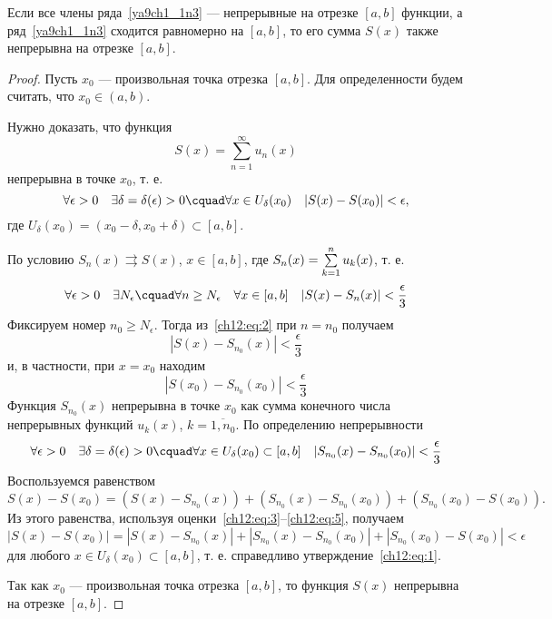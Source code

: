 \begin{thm}
	\label{ch12:th:continuity}
	Если все члены ряда~\eqref{ya9ch1_1n3} --- непрерывные на отрезке $[a, b]$ функции,
	а ряд~\eqref{ya9ch1_1n3} сходится равномерно на $[a, b]$, то его сумма $S(x)$
	также непрерывна на отрезке $[a, b]$.
\end{thm}
\begin{proof}
	Пусть $x_0$ --- произвольная точка отрезка $[a, b]$. Для определенности будем считать,
	что $x_0 \in (a, b)$.

	Нужно доказать, что функция
	$$
		S(x) = \sum_{n=1}^{\infty} u_n(x)
	$$
	непрерывна в точке $x_0$, т. е.
	\begin{equation}
		\label{ch12:eq:1}
		\forall \epsilon > 0 \quad \exists \delta = \delta(\epsilon) > 0 \cquad
			\forall x \in U_{\delta}(x_0) \quad |S(x) - S(x_0)| < \epsilon,
	\end{equation}
	где $U_{\delta}(x_0) = (x_0 - \delta, x_0 + \delta) \subset [a, b]$.

	По условию $S_n(x) \rightrightarrows S(x)$, $x \in [a, b]$,
	где $S_n(x) = \sum_{k=1}^{n}\limits u_k(x)$, т. е.
	\begin{equation}
		\label{ch12:eq:2}
		\forall \epsilon > 0 \quad \exists N_{\epsilon} \cquad \forall n \ge N_{\epsilon} \quad
			\forall x \in [a, b] \quad |S(x) - S_n(x)| < \frac{\epsilon}{3}
	\end{equation}
	Фиксируем номер $n_0 \ge N_{\epsilon}$. Тогда из~\eqref{ch12:eq:2} при $n = n_0$ получаем
	\begin{equation}
		\label{ch12:eq:3}
		|S(x) - S_{n_0}(x)| < \frac{\epsilon}{3}
	\end{equation}
	и, в частности, при $x = x_0$ находим
	\begin{equation}
		\label{ch12:eq:4}
		|S(x_0) - S_{n_0}(x_0)| < \frac{\epsilon}{3}
	\end{equation}
	Функция $S_{n_0}(x)$ непрерывна в точке $x_0$ как сумма конечного числа непрерывных функций
	$u_k(x)$, $k = \overline{1, n_0}$. По определению непрерывности
	\begin{equation}
		\label{ch12:eq:5}
		\forall \epsilon > 0 \quad \exists \delta = \delta(\epsilon) > 0 \cquad
			\forall x \in U_\delta(x_0) \subset [a, b] \quad |S_{n_0}(x) - S_{n_0}(x_0)| < \frac{\epsilon}{3}
	\end{equation}
	Воспользуемся равенством
	$$
		S(x) - S(x_0) = (S(x) - S_{n_0}(x)) + (S_{n_0}(x) - S_{n_0}(x_0)) + (S_{n_0}(x_0) - S(x_0)).
	$$
	Из этого равенства, используя оценки~\eqref{ch12:eq:3}--\eqref{ch12:eq:5}, получаем
	$$
		|S(x) - S(x_0)| = |S(x) - S_{n_0}(x)| + |S_{n_0}(x) - S_{n_0}(x_0)| + |S_{n_0}(x_0) - S(x_0)| < \epsilon
	$$
	для любого $x \in U_\delta(x_0) \subset [a, b]$, т. е. справедливо утверждение~\eqref{ch12:eq:1}.

	Так как $x_0$ --- произвольная точка отрезка $[a, b]$, то функция $S(x)$ непрерывна на отрезке $[a, b]$.
\end{proof}


